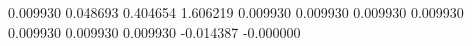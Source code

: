0.009930
0.048693
0.404654
1.606219
0.009930
0.009930
0.009930
0.009930
0.009930
0.009930
0.009930
-0.014387
-0.000000

